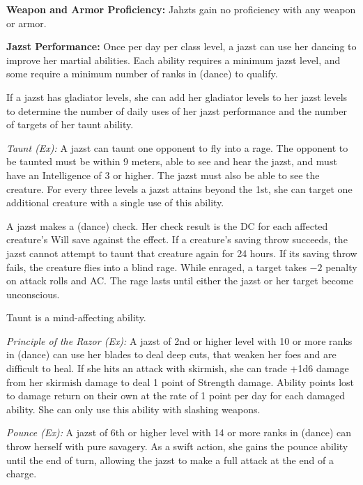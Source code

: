{
\textbf{Weapon and Armor Proficiency:} Jahzts gain no proficiency with any weapon or armor.

\textbf{Jazst Performance:} Once per day per class level, a jazst can use her dancing to improve her martial abilities. Each ability requires a minimum jazst level, and some require a minimum number of ranks in  (dance) to qualify.

If a jazst has gladiator levels, she can add her gladiator levels to her jazst levels to determine the number of daily uses of her jazst performance and the number of targets of her taunt ability.

\textit{Taunt (Ex):} A jazst can taunt one opponent to fly into a rage. The opponent to be taunted must be within 9 meters, able to see and hear the jazst, and must have an Intelligence of 3 or higher. The jazst must also be able to see the creature. For every three levels a jazst attains beyond the 1st, she can target one additional creature with a single use of this ability.

A jazst makes a  (dance) check. Her check result is the DC for each affected creature's Will save against the effect. If a creature's saving throw succeeds, the jazst cannot attempt to taunt that creature again for 24 hours. If its saving throw fails, the creature flies into a blind rage. While enraged, a target takes $-2$ penalty on attack rolls and AC. The rage lasts until either the jazst or her target become unconscious.

Taunt is a mind-affecting ability.

\textit{Principle of the Razor (Ex):} A jazst of 2nd or higher level with 10 or more ranks in  (dance) can use her blades to deal deep cuts, that weaken her foes and are difficult to heal. If she hits an attack with skirmish, she can trade +1d6 damage from her skirmish damage to deal 1 point of Strength damage. Ability points lost to damage return on their own at the rate of 1 point per day for each damaged ability. She can only use this ability with slashing weapons.

\textit{Pounce (Ex):} A jazst of 6th or higher level with 14 or more ranks in  (dance) can throw herself with pure savagery. As a swift action, she gains the pounce ability until the end of turn, allowing the jazst to make a full attack at the end of a charge.

}
